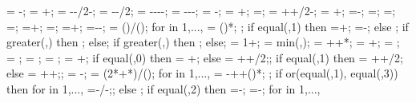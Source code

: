 {{\rigbasestartx = -\supportwidth;
\rigbaseendx = \x{\columnnumber}+\supportwidth;
\isoboty = -\supportheight-\baselinet/2-\isolationdepth;
\isotopy = -\supportheight-\baselinet/2;
\foundboty = -\supportheight-\baselinet-\isolationdepth-\foundationdepth;
\foundtopy = -\supportheight-\baselinet-\isolationdepth;
\foundstartx = -\foundsidew;
\foundendx = \x{\columnnumber}+\foundsidew;
\structheight=\storynumber*\storyheight;
\isomidy = \supportheight+\isolinet+\isolationdepth/2-\baselinet;
\soilbelowfoundtof = \soilbelowfound+\supportheight;
\basewallstartx=-\supportwidth;
\buildingwidth=\baynumber*\baywidth;
\basewalldepth=\subfloors*\storyheight;
\basewallstarty=\basewalldepth;
\basewallendx=\buildingwidth+\supportwidth;
\basewallendy=\basewallstarty;
\rightsoilx=\buildingwidth+\rightsoildist;
\rightsoily=\basewalldepth-\rightsoildepth-\supportheight;
\isospace = (\buildingwidth)/();
for \kiso in {1,...,{\numberofisolators}}{
\xiso{\kiso} = ()*\isospace;
};
if equal(\isoshiftyn,1) then
{=+\isoshift;
\xiso{\numberofisolators}=\xiso{\numberofisolators}-\isoshift;}
else {};
if greater(\doflocfloor,\storynumber) then {;} else{};
if greater(\dofloccolumn,\columnnumber) then {;} else{};
\dofloch = 1+\doflocfloor;
\minlen = min(\storyheight,\baywidth);
\dofxx = \x{\dofloccolumn}+\dofoffsetratio*\minlen+*\showdefl;
\dofyy = \y{\dofloch}+\dofoffsetratio*\minlen;
\arrlen = \arrowlenratio*\minlen;
\arrrad = \rotarrowlenratio*\minlen;
\Xaxesstarty = ;
\Yaxesstartx = ;
\Yaxesstarty = \y{\levelnumber}+\axisseperation;
if equal(\showsupports,0) then
{\Xaxesstartx = \x{\columnnumber}+\axisseperation;} else
{\Xaxesstartx = \x{\columnnumber}+\axisseperation+\supportwidth/2;};
if equal(\showsupports,1) then
{\Xaxesstartx = \x{\columnnumber}+\axisseperation+\supportwidth/2;} else
{\Xaxesstartx = \x{\columnnumber}+\axisseperation+\supportwidth;};
\pilecoordy = -\supportheight;
\pilespace = 
(2*\supportwidth+*\pilesidespace)/();
for \pileind in {1,...,{\numberofpiles}}{
\pilecoordx{\pileind} = -\supportwidth+\pilesidespace+()*\pilespace;
};
if or(equal(\latloadtype,1), equal(\latloadtype,3)) then {
for \iarr in {1,...,{\levelnumber}}{
	\arrstartx{\iarr}=-\toparrlen*\y{\iarr}/\structheight-\latloadshift;};
} else {};
if equal(\latloadtype,2) then {
	=-\latloadshift;
	=-\isomidy;
	for \iarr in {1,...,{\levelnumber}}{
}}}}
